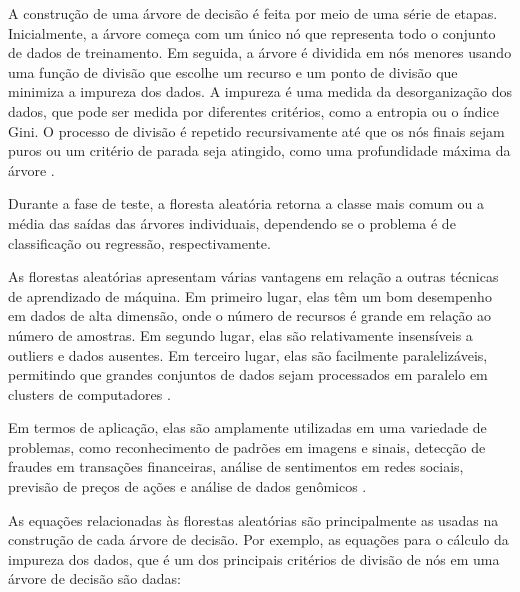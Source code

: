 A construção de uma árvore de decisão é feita por meio de uma série de etapas. Inicialmente, a árvore começa com um único nó que representa todo o conjunto de dados de treinamento. Em seguida, a árvore é dividida em nós menores usando uma função de divisão que escolhe um recurso e um ponto de divisão que minimiza a impureza dos dados. A impureza é uma medida da desorganização dos dados, que pode ser medida por diferentes critérios, como a entropia ou o índice Gini. O processo de divisão é repetido recursivamente até que os nós finais sejam puros ou um critério de parada seja atingido, como uma profundidade máxima da árvore \citep{cutler2001random}.

Durante a fase de teste, a floresta aleatória retorna a classe mais comum ou a média das saídas das árvores individuais, dependendo se o problema é de classificação ou regressão, respectivamente.

As florestas aleatórias apresentam várias vantagens em relação a outras técnicas de aprendizado de máquina. Em primeiro lugar, elas têm um bom desempenho em dados de alta dimensão, onde o número de recursos é grande em relação ao número de amostras. Em segundo lugar, elas são relativamente insensíveis a outliers e dados ausentes. Em terceiro lugar, elas são facilmente paralelizáveis, permitindo que grandes conjuntos de dados sejam processados em paralelo em clusters de computadores \citep{cutler2001random}.

Em termos de aplicação, elas são amplamente utilizadas em uma variedade de problemas, como reconhecimento de padrões em imagens e sinais, detecção de fraudes em transações financeiras, análise de sentimentos em redes sociais, previsão de preços de ações e análise de dados genômicos \citep{breiman2001random}.

As equações relacionadas às florestas aleatórias são principalmente as usadas na construção de cada árvore de decisão. Por exemplo, as equações para o cálculo da impureza dos dados, que é um dos principais critérios de divisão de nós em uma árvore de decisão são dadas:

